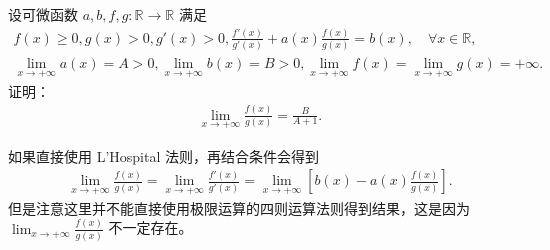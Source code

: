 \documentclass[../../main.tex]{subfiles}
\begin{document}
\begin{example}
设可微函数 \(a, b, f, g : \mathbb{R} \to \mathbb{R}\) 满足
\begin{align*}
f(x) \geqslant 0, g(x) > 0, g'(x) > 0, \frac{f'(x)}{g'(x)} + a(x) \frac{f(x)}{g(x)} = b(x), \quad \forall x \in \mathbb{R}, \\
\lim_{x \to +\infty} a(x) = A > 0, \lim_{x \to +\infty} b(x) = B > 0, \lim_{x \to +\infty} f(x) = \lim_{x \to +\infty} g(x) = +\infty.
\end{align*}
证明：
\begin{align*}
\lim_{x \to +\infty} \frac{f(x)}{g(x)} = \frac{B}{A + 1}.
\end{align*} 
\end{example}
\begin{remark}
如果直接使用 L'Hospital 法则，再结合条件会得到
\begin{align*}
\lim_{x \to +\infty} \frac{f(x)}{g(x)} = \lim_{x \to +\infty} \frac{f'(x)}{g'(x)} = \lim_{x \to +\infty} \left[ b(x) - a(x) \frac{f(x)}{g(x)} \right].
\end{align*}
但是注意这里并不能直接使用极限运算的四则运算法则得到结果，这是因为 \(\lim_{x \to +\infty} \frac{f(x)}{g(x)}\) 不一定存在。 
\end{remark}
\end{document}
